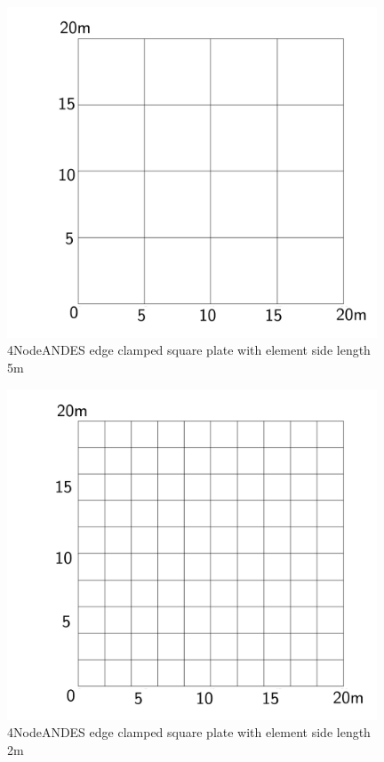 \documentclass[fleqn,11pt]{article}
\begin{document}
\newpage

\begin{figure}[H]
  \centering
  \includegraphics[width=11cm]{../Figure-files/square_plate2.pdf}
  \caption{4NodeANDES edge clamped square plate with element side length 5m }
  \label{fig 4NodeANDES edges clamped square plate with element side length 5m }
\end{figure}


\begin{figure}[H]
  \centering
  \includegraphics[width=11cm]{../Figure-files/square_plate3.pdf}
  \caption{4NodeANDES edge clamped square plate with element side length 2m }
  \label{fig 4NodeANDES edges clamped square plate with element side length 2m }
\end{figure}
\end{document}
